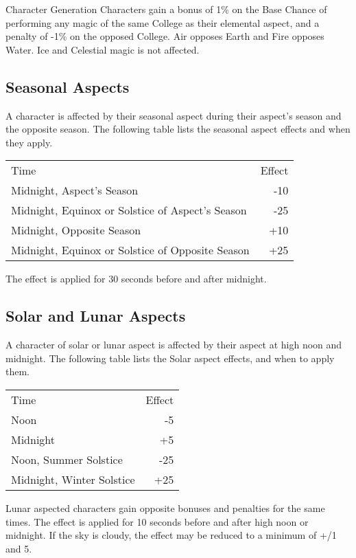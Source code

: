 \begin{Chapter}{Character Generation}
Characters gain a bonus of 1\% on the Base Chance of performing any
magic of the same College as their elemental aspect, and a penalty of
-1\% on the opposed College.  Air opposes Earth and Fire opposes
Water.  Ice and Celestial magic is not affected.

\subsection{Seasonal Aspects}

A character is affected by their seasonal aspect during their aspect’s
season and the opposite season.  The following table lists the
seasonal aspect effects and when they apply.

\begin{tabularx}{\columnwidth}{Xr}
Time							& Effect \\
Midnight, Aspect’s Season				& -10 \\
Midnight, Equinox or Solstice of Aspect’s Season	& -25 \\
Midnight, Opposite Season				& +10 \\
Midnight, Equinox or Solstice of Opposite Season	& +25 \\
\end{tabularx}

The effect is applied for 30 seconds before and after midnight.

\subsection{Solar and Lunar Aspects}

A character of solar or lunar aspect is affected by their aspect at
high noon and midnight. The following table lists the Solar aspect
effects, and when to apply them.

\begin{tabularx}{\columnwidth}{Xr}
Time				& Effect \\
Noon				& -5 \\
Midnight			& +5 \\
Noon, Summer Solstice		& -25 \\
Midnight, Winter Solstice	& +25 \\
\end{tabularx}

Lunar aspected characters gain opposite bonuses and penalties for the
same times.  The effect is applied for 10 seconds before and after
high noon or midnight. If the sky is cloudy, the effect may be reduced
to a minimum of +/1 and 5.


\end{Chapter}
